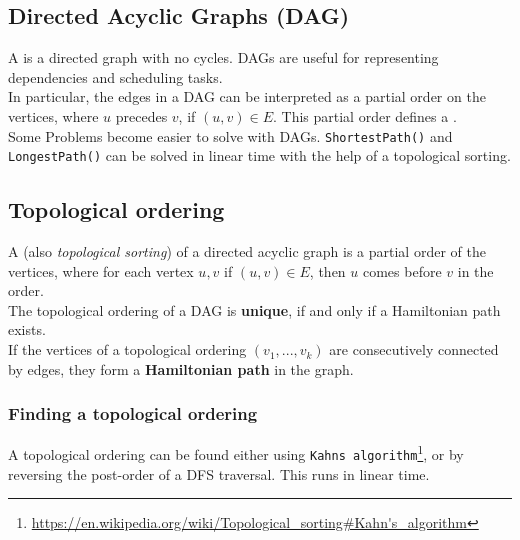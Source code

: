 \documentclass[a3paper, landscape, 11pt]{article} %
\begin{document}
\begin{multicols*}{4}

\subsection*{Directed Acyclic Graphs (DAG)}
A  is a directed graph with no cycles. DAGs are useful for representing dependencies and scheduling tasks. \\

In particular, the edges in a DAG can be interpreted as a partial order on the vertices, where $u$ precedes $v$, if $(u,v) \in E$. This partial order defines a .\\

Some Problems become easier to solve with DAGs. \texttt{ShortestPath()} and \texttt{LongestPath()} can be solved in linear time with the help of a topological sorting.

\hfill %

\subsection*{Topological ordering}
A  (also \textit{topological sorting}) of a directed acyclic graph is a partial order of the vertices, where for each vertex $u,v$ if $(u,v)\in E$, then $u$ comes before $v$ in the order.\\

The topological ordering of a DAG is \textbf{unique}, if and only if a Hamiltonian path exists.\\

If the vertices of a topological ordering $(v_1,...,v_k)$ are consecutively connected by edges, they form a \textbf{Hamiltonian path} in the graph. 

\subsubsection*{Finding a topological ordering}

A topological ordering can be found either using \texttt{Kahns algorithm}\footnote{\url{https://en.wikipedia.org/wiki/Topological_sorting\#Kahn's_algorithm}}, or by reversing the post-order of a DFS traversal. This runs in linear time.\\


\end{multicols*}
\end{document}
